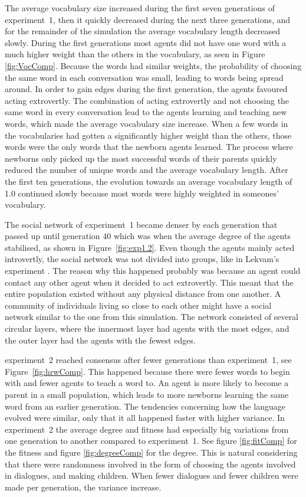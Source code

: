 The average vocabulary size increased during the first seven generations of experiment~1, then it quickly decreased during the next three generations, and for the remainder of the simulation the average vocabulary length decreased slowly. During the first generations most agents did not have one word with a much higher weight than the others in the vocabulary, as seen in Figure \ref{fig:VocComp}. Because the words had similar weights, the probability of choosing the same word in each conversation was small, leading to words being spread around. In order to gain edges during the first generation, the agents favoured acting extrovertly. The combination of acting extrovertly and not choosing the same word in every conversation lead to the agents learning and teaching new words, which made the average vocabulary size increase. When a few words in the vocabularies had gotten a significantly higher weight than the others, those words were the only words that the newborn agents learned. The process where newborns only picked up the most successful words of their parents quickly reduced the number of unique words and the average vocabulary length. After the first ten generations, the evolution towards an average vocabulary length of 1.0 continued slowly because most words were highly weighted in someones' vocabulary.
 
The social network of experiment~1 became denser by each generation that passed up until generation $40$ which was when the average degree of the agents stabilised, as shown in Figure~\ref{fig:exp1.2}. Even though the agents mainly acted introvertly, the social network was not divided into groups, like in Lekvam’s experiment \citep[Section 5.1]{lekvam2014co}. The reason why this happened probably was because an agent could contact any other agent when it decided to act extrovertly. This meant that the entire population existed without any physical distance from one another. A community of individuals living so close to each other might have a social network similar to the one from this simulation. The network consisted of several circular layers, where the innermost layer had agents with the most edges, and the outer layer had the agents with the fewest edges.

experiment~2 reached consensus after fewer generations than experiment~1, see Figure~\ref{fig:hrwComp}. This happened because there were fewer words to begin with and fewer agents to teach a word to. An agent is more likely to become a parent in a small population, which leads to more newborns learning the same word from an earlier generation. The tendencies concerning how the language evolved were similar, only that it all happened faster with higher variance. In experiment~2 the average degree and fitness had especially big variations from one generation to another compared to experiment~1. See figure \ref{fig:fitComp} for the fitness and figure \ref{fig:degreeComp} for the degree. This is natural considering that there were randomness involved in the form of choosing the agents involved in dialogues, and making children. When fewer dialogues and fewer children were made per generation, the variance increase.

